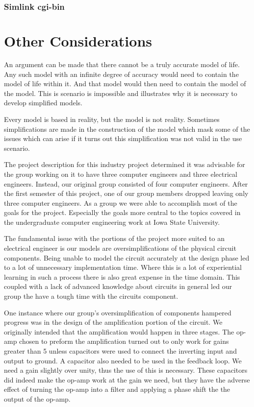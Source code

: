 \documentclass{article}	%
\begin{document}
\begin{multicols}{2}
\subsubsection{Simlink cgi-bin}

\newpage
\section{Other Considerations}
An argument can be made that there
cannot be a truly accurate model of life.
Any such model with an infinite degree of accuracy
would need to contain the model of life within it.
And that model would then need to contain
the model of the model.
This is scenario is impossible and 
illustrates why it is necessary to develop
simplified models.

Every model is based in reality, but
the model is not reality.
Sometimes simplifications are made in
the construction of the model which mask
some of the issues which can arise if 
it turns out this simplification was
not valid in the use scenario.

The project description for this industry project
determined it was advisable for 
the group working on it to have three computer engineers and
three electrical engineers.
Instead, our original group consisted of four computer engineers.
After the first semester of this project,
one of our group members dropped leaving only three computer engineers.
As a group we were able to accomplish most of the goals for the project.
Especially the goals more central to the topics covered in the
undergraduate computer engineering work at Iowa State University.

The fundamental issue with the portions of the project
more suited to an electrical engineer is
our models are oversimplifications of 
the physical circuit components.
Being unable to model the circuit
accurately at the design phase led to
a lot of unnecessary implementation time.
Where this is a lot of experiential learning in
such a process there is also great expense in the time domain.
This coupled with a lack of advanced knowledge about
circuits in general led our group
the have a tough time with the circuits component.

One instance where our group's oversimplification of
components hampered progress was in the design of the
amplification portion of the circuit.
We originally intended that the amplification 
would happen in three stages.
The op-amp chosen to preform the amplification turned
out to only work for gains greater than 5 unless
capacitors were used to connect the inverting input and output to ground.
A capacitor also needed to be used in the feedback loop.
We need a gain slightly over unity,
thus the use of this is necessary.
These capacitors did indeed make the op-amp work at the gain we need, but
they have the adverse effect of turning the op-amp into a filter and
applying a phase shift the the output of the op-amp.


\end{multicols}
\end{document}
